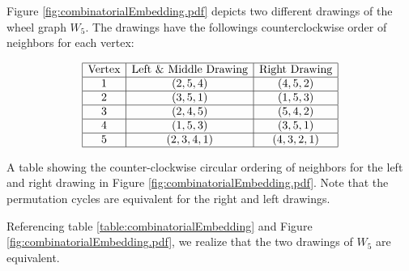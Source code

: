 \documentclass[10pt]{CSUNthesis}
\theoremstyle{plain}%
\theoremstyle{definition}
\theoremstyle{remark}
\newcommand{\bbZ}{{\mathbb{Z}}}
\newcommand{\lr}[1]{\left( #1 \right)}
\begin{document}
Figure \ref{fig:combinatorialEmbedding.pdf} depicts two different drawings of the wheel graph $W_5$.%
The drawings have the followings counterclockwise order of neighbors for each vertex:
\begin{table}[!htbp]\label{table:combinatorialEmbedding}
\begin{center}
$$\begin{array}{|c|c|c|}\hline
\text{Vertex}&\text{Left \& Middle Drawing}&\text{Right Drawing}\\\hline
1&(2,5,4)& (4,5,2) 
\\\hline
2&(3,5,1) & (1,5,3) 
\\\hline
3&(2,4,5)& (5,4,2) 
\\\hline
4& (1,5,3)  & (3,5,1) 
\\\hline
5&(2,3,4,1)& (4,3,2,1) 
\\\hline
\end{array} $$
\caption{A table showing the counter-clockwise circular ordering of neighbors for the left and right drawing in Figure \ref{fig:combinatorialEmbedding.pdf}.  Note that the permutation cycles are equivalent for the right and left drawings.}
\end{center} 
\end{table}
Referencing table \ref{table:combinatorialEmbedding} and Figure \ref{fig:combinatorialEmbedding.pdf}, we realize that the two drawings of $W_5$ are equivalent.  






 






\end{document}
